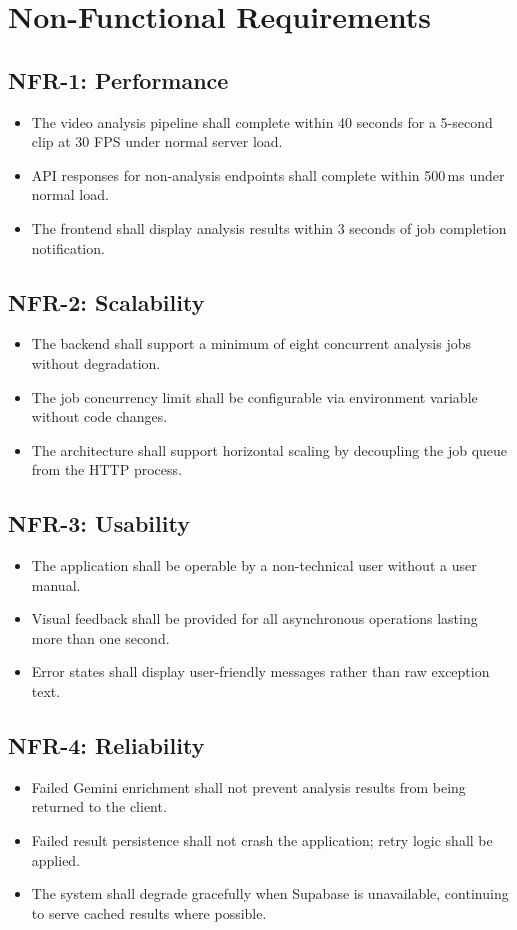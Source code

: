 \section{Non-Functional Requirements}
\label{sec:nfr}

\subsection{NFR-1: Performance}
\begin{itemize}
  \item The video analysis pipeline shall complete within 40 seconds for a 5-second clip at 30 FPS under normal server load.
  \item API responses for non-analysis endpoints shall complete within 500\,ms under normal load.
  \item The frontend shall display analysis results within 3 seconds of job completion notification.
\end{itemize}

\subsection{NFR-2: Scalability}
\begin{itemize}
  \item The backend shall support a minimum of eight concurrent analysis jobs without degradation.
  \item The job concurrency limit shall be configurable via environment variable without code changes.
  \item The architecture shall support horizontal scaling by decoupling the job queue from the HTTP process.
\end{itemize}

\subsection{NFR-3: Usability}
\begin{itemize}
  \item The application shall be operable by a non-technical user without a user manual.
  \item Visual feedback shall be provided for all asynchronous operations lasting more than one second.
  \item Error states shall display user-friendly messages rather than raw exception text.
\end{itemize}

\subsection{NFR-4: Reliability}
\begin{itemize}
  \item Failed Gemini enrichment shall not prevent analysis results from being returned to the client.
  \item Failed result persistence shall not crash the application; retry logic shall be applied.
  \item The system shall degrade gracefully when Supabase is unavailable, continuing to serve cached results where possible.
\end{itemize}

